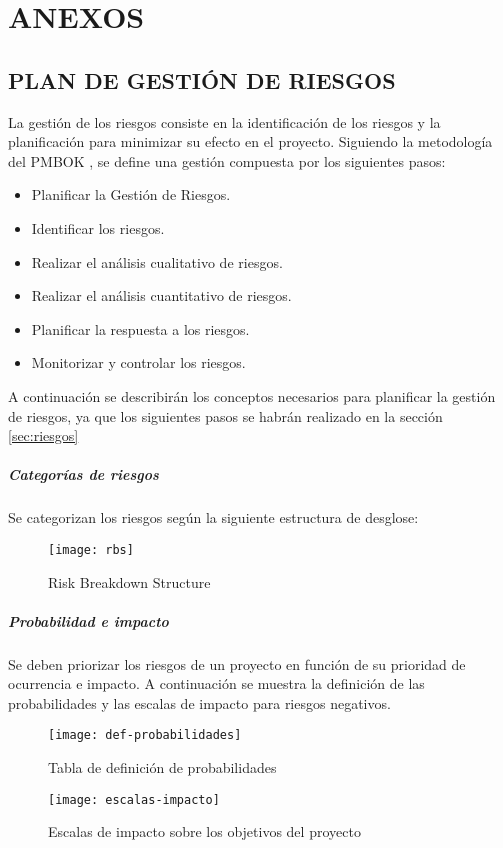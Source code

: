 \newpage
\chapter{ANEXOS}
\newpage
\section{PLAN DE GESTIÓN DE RIESGOS}\label{sec:plan-riesgos}
La gestión de los riesgos consiste en la identificación de los riesgos y la planificación para minimizar su efecto en el proyecto. Siguiendo la metodología del PMBOK \cite{PMBOK}, se define una gestión compuesta por los siguientes pasos:
\begin{itemize}
\item Planificar la Gestión de Riesgos.
\item Identificar los riesgos.
\item Realizar el análisis cualitativo de riesgos.
\item Realizar el análisis cuantitativo de riesgos.
\item Planificar la respuesta a los riesgos.
\item Monitorizar y controlar los riesgos.
\end{itemize}
A continuación se describirán los conceptos necesarios para planificar la gestión de riesgos, ya que los siguientes pasos se habrán realizado en la sección \ref{sec:riesgos}
\paragraph*{Categorías de riesgos}
Se categorizan los riesgos según la siguiente estructura de desglose:
\begin{figure}[H]
\centering
\centerline{\texttt{[image: rbs]}}
\caption{Risk Breakdown Structure}
\end{figure}

\paragraph*{Probabilidad e impacto}
Se deben priorizar los riesgos de un proyecto en función de su prioridad de ocurrencia e impacto. A continuación se muestra la definición de las probabilidades y las escalas de impacto para riesgos negativos.
\begin{figure}[H]
\centering
\centerline{\texttt{[image: def-probabilidades]}}
\caption{Tabla de definición de probabilidades}
\end{figure}
\begin{figure}[H]
\centering
\centerline{\texttt{[image: escalas-impacto]}}
\caption{Escalas de impacto sobre los objetivos del proyecto}
\end{figure}

